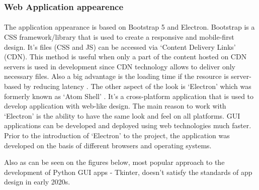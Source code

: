 \documentclass[12pt]{report}
\begin{document}
\subsubsection*{Web Application appearence}
\paragraph{}
The application appearance is based on Bootstrap 5 and Electron. Bootstrap \citep{bootstrap} is a CSS framework/library 
that is used to create a responsive and mobile-first design. It's files (CSS and JS) can be accessed via `Content 
Delivery Links' (CDN). This method is useful when only a part of the content hosted on CDN servers is used in
development since CDN technology allows to deliver only necessary files. Also a big advantage is the loading time
if the resource is server-based by reducing latency \citep{cdnetworks}. The other aspect of the look is `Electron' which
was formerly known as `Atom Shell' \citep{a2015_atom}. It's a cross-platform application that is used to develop
application with web-like design. The main reason to work with `Electron' is the ability to have the same look and feel
on all platforms. GUI applications can be developed and deployed using web technologies much faster. Prior to the introduction 
of `Electron' to the project, the application was developed on the basis of different browsers and operating systems.

Also as can be seen on the figures below, most popular approach to the development of Python GUI apps - Tkinter, doesn't
satisfy the standards of app design in early 2020s. 
\end{document}
